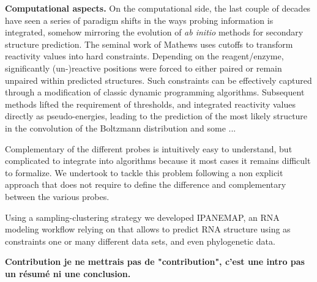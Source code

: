 \documentclass[a4,center,fleqn]{NAR}
\newcommand{\Software}[1]{\text{\ttfamily\bfseries #1}}
\begin{document}
{\noindent\bf Computational aspects.}
On the computational side, the last couple of decades have seen a series of paradigm shifts in the ways probing information is integrated, somehow mirroring the evolution of {\em ab initio} methods for secondary structure prediction. The seminal work of Mathews uses cutoffs to transform reactivity values into hard constraints. Depending on the reagent/enzyme, significantly (un-)reactive positions were forced to either paired or remain unpaired within predicted structures. Such constraints can be effectively captured through a modification of classic dynamic programming algorithms. Subsequent methods lifted the requirement of thresholds, and integrated reactivity values directly as pseudo-energies, leading to the prediction of the most likely structure in the convolution of the Boltzmann distribution and some ...

Complementary of the different probes is intuitively easy to understand, but complicated to integrate into algorithms because it  most cases it remains difficult to formalize.
We undertook to tackle this problem following a non explicit approach that does not require to define the difference and complementary between the various probes.


Using a sampling-clustering strategy we developed IPANEMAP, an RNA modeling workflow relying on \Software{RNAsubpot} that allows to predict RNA structure using as constraints one or many different data sets, and even phylogenetic data. 


{\noindent\bf Contribution je ne mettrais pas de "contribution", c'est une intro pas un résumé ni une conclusion.}

\end{document}
